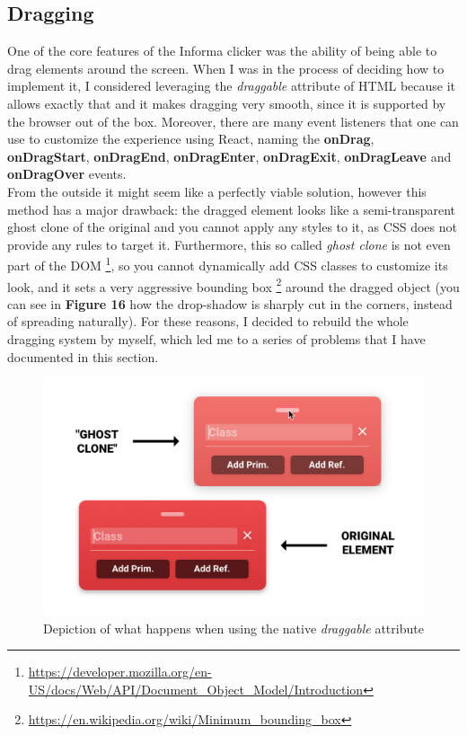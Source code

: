 \documentclass[]{usiinfbachelorproject}
\begin{document}
\subsection{Dragging}

One of the core features of the Informa clicker was the ability of being able to drag elements around the screen. When I was in the process of deciding how to implement it, I considered leveraging the \emph{draggable} attribute of HTML because it allows exactly that and it makes dragging very smooth, since it is supported by the browser out of the box. Moreover, there are many event listeners that one can use to customize the experience using React, naming the \textbf{onDrag}, \textbf{onDragStart}, \textbf{onDragEnd}, \textbf{onDragEnter}, \textbf{onDragExit}, \textbf{onDragLeave} and \textbf{onDragOver} events.\\
From the outside it might seem like a perfectly viable solution, however this method has a major drawback: the dragged element looks like a semi-transparent ghost clone of the original and you cannot apply any styles to it, as CSS does not provide any rules to target it. Furthermore, this so called \emph{ghost clone} is not even part of the DOM \footnote{\url{https://developer.mozilla.org/en-US/docs/Web/API/Document_Object_Model/Introduction}}, so you cannot dynamically add CSS classes to customize its look, and it sets a very aggressive bounding box \footnote{\url{https://en.wikipedia.org/wiki/Minimum_bounding_box}} around the dragged object (you can see in \textbf{Figure 16} how the drop-shadow is sharply cut in the corners, instead of spreading naturally).
For these reasons, I decided to rebuild the whole dragging system by myself, which led me to a series of problems that I have documented in this section.
 
\begin{figure}[h!]
\centering
\includegraphics[scale=.5]{figures/ghost-clone.png}
\caption {Depiction of what happens when using the native \emph{draggable} attribute}
\end{figure}
 
\end{document}
